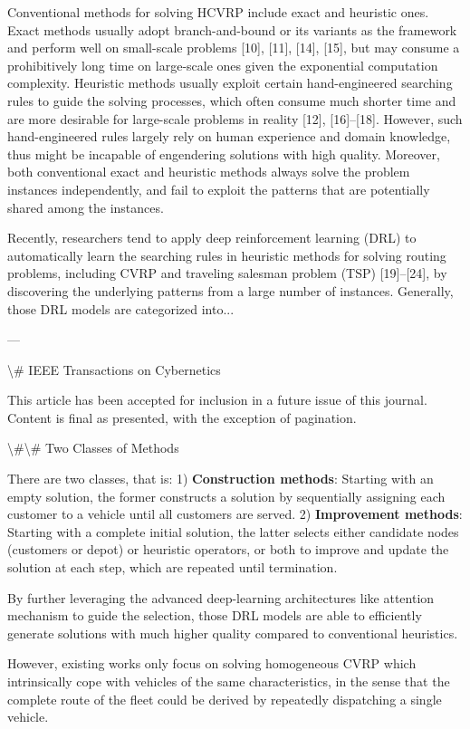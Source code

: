 \documentclass{article}
\begin{document}
	Conventional methods for solving HCVRP include exact and heuristic ones. Exact methods usually adopt branch-and-bound or its variants as the framework and perform well on small-scale problems [10], [11], [14], [15], but may consume a prohibitively long time on large-scale ones given the exponential computation complexity. Heuristic methods usually exploit certain hand-engineered searching rules to guide the solving processes, which often consume much shorter time and are more desirable for large-scale problems in reality [12], [16]–[18]. However, such hand-engineered rules largely rely on human experience and domain knowledge, thus might be incapable of engendering solutions with high quality. Moreover, both conventional exact and heuristic methods always solve the problem instances independently, and fail to exploit the patterns that are potentially shared among the instances.
	
	Recently, researchers tend to apply deep reinforcement learning (DRL) to automatically learn the searching rules in heuristic methods for solving routing problems, including CVRP and traveling salesman problem (TSP) [19]–[24], by discovering the underlying patterns from a large number of instances. Generally, those DRL models are categorized into...
	
	---
	
	\textbackslash{}# IEEE Transactions on Cybernetics
	
	This article has been accepted for inclusion in a future issue of this journal. Content is final as presented, with the exception of pagination.
	
	\textbackslash{}#\textbackslash{}# Two Classes of Methods
	
	There are two classes, that is:
	1) \textbf{Construction methods}: Starting with an empty solution, the former constructs a solution by sequentially assigning each customer to a vehicle until all customers are served.
	2) \textbf{Improvement methods}: Starting with a complete initial solution, the latter selects either candidate nodes (customers or depot) or heuristic operators, or both to improve and update the solution at each step, which are repeated until termination.
	
	By further leveraging the advanced deep-learning architectures like attention mechanism to guide the selection, those DRL models are able to efficiently generate solutions with much higher quality compared to conventional heuristics.
	
	However, existing works only focus on solving homogeneous CVRP which intrinsically cope with vehicles of the same characteristics, in the sense that the complete route of the fleet could be derived by repeatedly dispatching a single vehicle.
	
\end{document}
